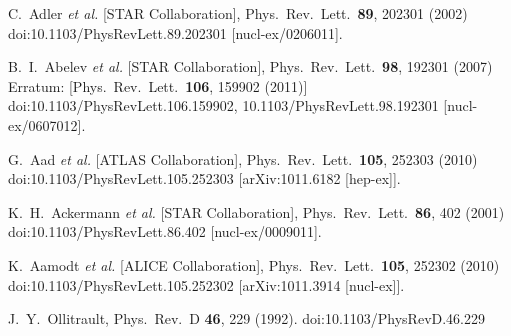 \documentclass[aps,prc,twocolumn,superscriptaddress,showpacs,floatfix,nofootinbib]{revtex4-1}
\begin{document}
\begin{thebibliography}{99}

  C.~Adler {\it et al.} [STAR Collaboration],
  Phys.\ Rev.\ Lett.\  {\bf 89}, 202301 (2002)
  doi:10.1103/PhysRevLett.89.202301
  [nucl-ex/0206011].


  B.~I.~Abelev {\it et al.} [STAR Collaboration],
  Phys.\ Rev.\ Lett.\  {\bf 98}, 192301 (2007)
  Erratum: [Phys.\ Rev.\ Lett.\  {\bf 106}, 159902 (2011)]
  doi:10.1103/PhysRevLett.106.159902, 10.1103/PhysRevLett.98.192301
  [nucl-ex/0607012].


  G.~Aad {\it et al.} [ATLAS Collaboration],
  Phys.\ Rev.\ Lett.\  {\bf 105}, 252303 (2010)
  doi:10.1103/PhysRevLett.105.252303
  [arXiv:1011.6182 [hep-ex]].


  K.~H.~Ackermann {\it et al.} [STAR Collaboration],
  Phys.\ Rev.\ Lett.\  {\bf 86}, 402 (2001)
  doi:10.1103/PhysRevLett.86.402
  [nucl-ex/0009011].


  K.~Aamodt {\it et al.} [ALICE Collaboration],
  Phys.\ Rev.\ Lett.\  {\bf 105}, 252302 (2010)
  doi:10.1103/PhysRevLett.105.252302
  [arXiv:1011.3914 [nucl-ex]].


  J.~Y.~Ollitrault,
  Phys.\ Rev.\ D {\bf 46}, 229 (1992).
  doi:10.1103/PhysRevD.46.229



\end{thebibliography}
\end{document}

